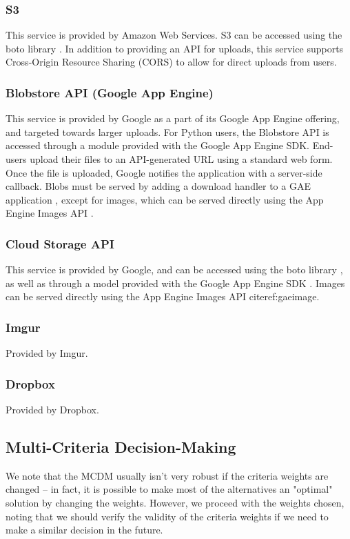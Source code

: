 \documentclass[se]{uw-wkrpt}
\begin{document}
\subsubsection{S3}
This service is provided by Amazon Web Services. S3 can be accessed using the 
boto library \cite{ref:botoreadme}. In addition to providing an API for 
uploads, this service supports Cross-Origin Resource Sharing (CORS) to allow 
for direct uploads from users\cite{ref:s3cors}.

\subsubsection{Blobstore API (Google App Engine)}
This service is provided by Google as a part of its Google App Engine offering, 
and targeted towards larger uploads.  For Python users, the Blobstore API is 
accessed through a module provided with the Google App Engine SDK. End-users 
upload their files to an API-generated URL using a standard web form. Once the 
file is uploaded, Google notifies the application with a server-side callback.  
Blobs must be served by adding a download handler to a GAE application 
\cite{ref:gaeblob}, except for images, which can be served directly using the 
App Engine Images API \cite{ref:gaeimage}.

\subsubsection{Cloud Storage API}
This service is provided by Google, and can be accessed using the boto library 
\cite{ref:botoreadme}, as well as through a model provided with the Google App 
Engine SDK \cite{ref:gaecs}. Images can be served directly using the App Engine 
Images API cite{ref:gaeimage}.

\subsubsection{Imgur}
Provided by Imgur.

\subsubsection{Dropbox}
Provided by Dropbox.

\subsection{Multi-Criteria Decision-Making}
We note that the MCDM usually isn't very robust if the criteria weights are 
changed -- in fact, it is possible to make most of the alternatives an 
"optimal" solution by changing the weights. However, we proceed with the 
weights chosen, noting that we should verify the validity of the criteria 
weights if we need to make a similar decision in the future.
\end{document}
